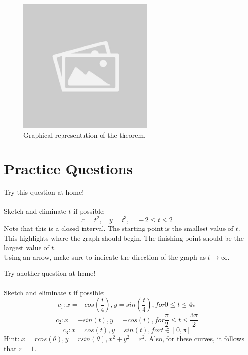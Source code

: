\documentclass{article}
\begin{document}
\begin{figure}[H]
    \centering
    \includegraphics[width=0.6\textwidth]{sample_image1.jpg}
    \caption{Graphical representation of the theorem.}
    \label{fig:sample_image1}
\end{figure}

\section*{Practice Questions}
\begin{notebox}
Try this question at home! \\
\\
Sketch and eliminate \( t \) if possible: \\
\[
    x = t^2, \quad y = t^3, \quad -2 \leq t \leq 2
\]
Note that this is a closed interval. The starting point is the smallest value of \( t \). This highlights where the graph should begin. The finishing point should be the largest value of \( t \). \\
Using an arrow, make sure to indicate the direction of the graph as \( t \to \infty \). \\
\end{notebox}

\begin{notebox}
Try another question at home! \\
\\
Sketch and eliminate \( t \) if possible: \\
\[
    c_1: x = -cos(\frac{t}{4}), y = sin(\frac{t}{4}), for 0 \leq t \leq 4\pi
\]
\[
    c_2: x = -sin(t), y = -cos(t), for \frac{\pi}{2} \leq t \leq \frac{3\pi}{2}
\]
\[
    c_3: x = cos(t), y = sin(t), for t \in [0, \pi]
\]
Hint: \( x = rcos(\theta), y = rsin(\theta), x^2 + y^2 = r^2 \). Also, for these curves, it follows that \( r = 1 \).
\end{notebox}
\end{document}
